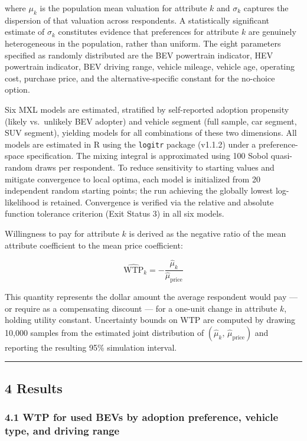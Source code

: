 \documentclass[
  letterpaper,
  DIV=11,
  numbers=noendperiod]{scrartcl}
\begin{document}
where \(\mu_k\) is the population mean valuation for attribute \(k\) and
\(\sigma_k\) captures the dispersion of that valuation across
respondents. A statistically significant estimate of \(\sigma_k\)
constitutes evidence that preferences for attribute \(k\) are genuinely
heterogeneous in the population, rather than uniform. The eight
parameters specified as randomly distributed are the BEV powertrain
indicator, HEV powertrain indicator, BEV driving range, vehicle mileage,
vehicle age, operating cost, purchase price, and the
alternative-specific constant for the no-choice option.

Six MXL models are estimated, stratified by self-reported adoption
propensity (likely vs.~unlikely BEV adopter) and vehicle segment (full
sample, car segment, SUV segment), yielding models for all combinations
of these two dimensions. All models are estimated in R using the
\texttt{logitr} package (v1.1.2) under a preference-space specification.
The mixing integral is approximated using 100 Sobol quasi-random draws
per respondent. To reduce sensitivity to starting values and mitigate
convergence to local optima, each model is initialized from 20
independent random starting points; the run achieving the globally
lowest log-likelihood is retained. Convergence is verified via the
relative and absolute function tolerance criterion (Exit Status 3) in
all six models.

Willingness to pay for attribute \(k\) is derived as the negative ratio
of the mean attribute coefficient to the mean price coefficient:

\[\widehat{\text{WTP}}_k = -\frac{\hat{\mu}_k}{\hat{\mu}_{\text{price}}}\]

This quantity represents the dollar amount the average respondent would
pay --- or require as a compensating discount --- for a one-unit change
in attribute \(k\), holding utility constant. Uncertainty bounds on WTP
are computed by drawing 10,000 samples from the estimated joint
distribution of \((\hat{\mu}_k,\, \hat{\mu}_{\text{price}})\) and
reporting the resulting 95\% simulation interval.

\begin{center}\rule{0.5\linewidth}{0.5pt}\end{center}

\subsection{4 Results}\label{results}

\subsubsection{4.1 WTP for used BEVs by adoption preference, vehicle
type, and driving
range}\label{wtp-for-used-bevs-by-adoption-preference-vehicle-type-and-driving-range}
\end{document}
